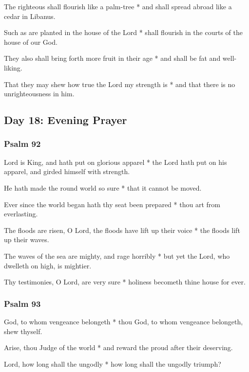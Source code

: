 The righteous shall flourish like a palm-tree * and shall spread abroad like a cedar in Libanus.

Such as are planted in the house of the Lord * shall flourish in the courts of the house of our God.

They also shall bring forth more fruit in their age * and shall be fat and well-liking.

That they may shew how true the Lord my strength is * and that there is no unrighteousness in him.

\subsection{Day 18: Evening Prayer}

\subsubsection{Psalm 92}


 Lord is King, and hath put on glorious apparel * the Lord hath put on his apparel, and girded himself with strength.

He hath made the round world so sure * that it cannot be moved.

Ever since the world began hath thy seat been prepared * thou art from everlasting.

The floods are risen, O Lord, the floods have lift up their voice * the floods lift up their waves.

The waves of the sea are mighty, and rage horribly * but yet the Lord, who dwelleth on high, is mightier.

Thy testimonies, O Lord, are very sure * holiness becometh thine house for ever.

\subsubsection{Psalm 93}


 God, to whom vengeance belongeth * thou God, to whom vengeance belongeth, shew thyself.

Arise, thou Judge of the world * and reward the proud after their deserving.

Lord, how long shall the ungodly * how long shall the ungodly triumph?

